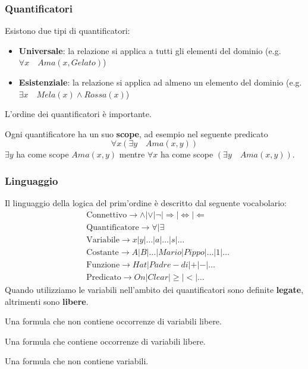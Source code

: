 \subsubsection{Quantificatori}
Esistono due tipi di quantificatori:
\begin{itemize}
	\item \textbf{Universale}: la relazione si applica a tutti gli elementi del dominio (e.g. $\forall x \quad Ama(x, Gelato)$)\\
	\item \textbf{Esistenziale}: la relazione si applica ad almeno un elemento del dominio (e.g. $\exists x \quad Mela(x) \land Rossa(x)$)
\end{itemize}
\begin{note}
	L'ordine dei quantificatori è importante.
\end{note}
Ogni quantificatore ha un suo \textbf{scope}, ad esempio nel seguente predicato
\begin{equation*}
	\forall x (\exists y \quad Ama(x,y))
\end{equation*}
$\exists y$ ha come scope $Ama(x,y)$ mentre $\forall x$ ha come scope $(\exists y \quad Ama(x,y))$.
\subsubsection{Linguaggio}
Il linguaggio della logica del prim'ordine è descritto dal seguente vocabolario:
\begin{align*}
	&\text{Connettivo} \rightarrow \land \vert \lor \vert \neg \vert \Rightarrow\vert\Leftrightarrow\vert\Leftarrow \\
	&\text{Quantificatore}\rightarrow\forall\vert\exists\\
	&\text{Variabile}\rightarrow x\vert y \vert \ldots \vert a \vert \ldots \vert s \vert \ldots\\
	&\text{Costante} \rightarrow A \vert B \vert \ldots \vert Mario \vert Pippo \vert \ldots \vert 1 \vert \ldots\\
	&\text{Funzione} \rightarrow Hat \vert Padre-di \vert + \vert - \vert \ldots\\
	&\text{Predicato} \rightarrow On \vert Clear \vert \geq \vert < \vert \ldots
\end{align*}
Quando utilizziamo le variabili nell'ambito dei quantificatori sono definite \textbf{legate}, altrimenti sono \textbf{libere}.

\begin{definition}
	Una formula che non contiene occorrenze di variabili libere.
\end{definition}
\begin{definition}
	Una formula che contiene occorrenze di variabili libere.
\end{definition}
\begin{definition}
	Una formula che non contiene variabili.
\end{definition}

